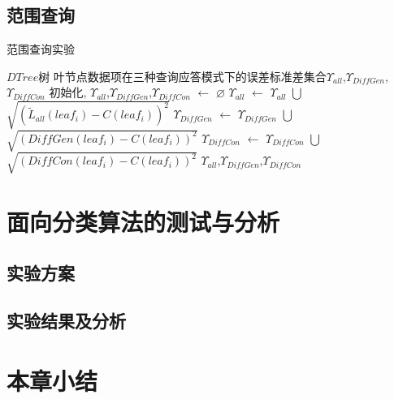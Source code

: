 \subsection{范围查询} 

\begin{algorithm}[H]
	\caption{范围查询实验}
	\begin{algorithmic}[1]
		\REQUIRE $DTree$树
		\ENSURE 叶节点数据项在三种查询应答模式下的误差标准差集合$\Upsilon_{all}$,$\Upsilon_{DiffGen}$,$\Upsilon_{DiffCon}$
		初始化, $\Upsilon_{all}$,$\Upsilon_{DiffGen}$,$\Upsilon_{DiffCon}$ $\leftarrow$ $\varnothing$
		\STATE $\Upsilon_{all}$ $\leftarrow$ $\Upsilon_{all}$ $\bigcup$ $\sqrt {(\tilde{L}_{all}(leaf_{i})-C(leaf_{i}))^2}$
		\STATE $\Upsilon_{DiffGen}$ $\leftarrow$ $\Upsilon_{DiffGen}$ $\bigcup$ $\sqrt {(DiffGen(leaf_{i})-C(leaf_{i}))^2}$
		\STATE $\Upsilon_{DiffCon}$ $\leftarrow$ $\Upsilon_{DiffCon}$ $\bigcup$ $\sqrt {(DiffCon(leaf_{i})-C(leaf_{i}))^2}$
		\ENDFOR
		\RETURN $\Upsilon_{all}$,$\Upsilon_{DiffGen}$,$\Upsilon_{DiffCon}$
	\end{algorithmic}
\end{algorithm}


\section{面向分类算法的测试与分析}

\subsection{实验方案}

\subsection{实验结果及分析}    

\section{本章小结}

